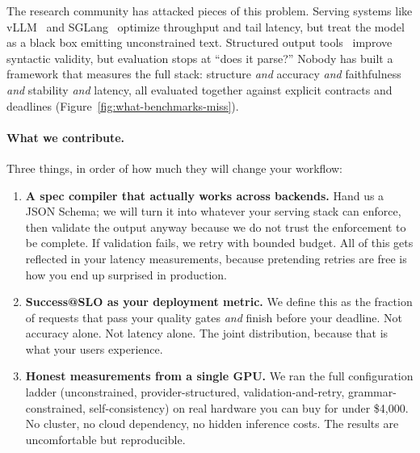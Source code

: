 \documentclass[11pt]{article}
\begin{document}
The research community has attacked pieces of this problem.
Serving systems like vLLM~\citep{kwon2023vllm} and SGLang~\citep{zheng2023sglang} optimize throughput and tail latency, but treat the model as a black box emitting unconstrained text.
Structured output tools~\citep{geng2025jsonschemabench,openaiStructuredOutputs} improve syntactic validity, but evaluation stops at ``does it parse?''
Nobody has built a framework that measures the full stack: structure \emph{and} accuracy \emph{and} faithfulness \emph{and} stability \emph{and} latency, all evaluated together against explicit contracts and deadlines (Figure~\ref{fig:what-benchmarks-miss}).

\paragraph{What we contribute.}
Three things, in order of how much they will change your workflow:

\begin{enumerate}[leftmargin=12pt]
    \item \textbf{A spec compiler that actually works across backends.}
    Hand us a JSON Schema; we will turn it into whatever your serving stack can enforce, then validate the output anyway because we do not trust the enforcement to be complete.
    If validation fails, we retry with bounded budget.
    All of this gets reflected in your latency measurements, because pretending retries are free is how you end up surprised in production.

    \item \textbf{Success@SLO as your deployment metric.}
    We define this as the fraction of requests that pass your quality gates \emph{and} finish before your deadline.
    Not accuracy alone.
    Not latency alone.
    The joint distribution, because that is what your users experience.

    \item \textbf{Honest measurements from a single GPU.}
    We ran the full configuration ladder (unconstrained, provider-structured, validation-and-retry, grammar-constrained, self-consistency) on real hardware you can buy for under \$4,000.
    No cluster, no cloud dependency, no hidden inference costs.
    The results are uncomfortable but reproducible.
\end{enumerate}
\end{document}
